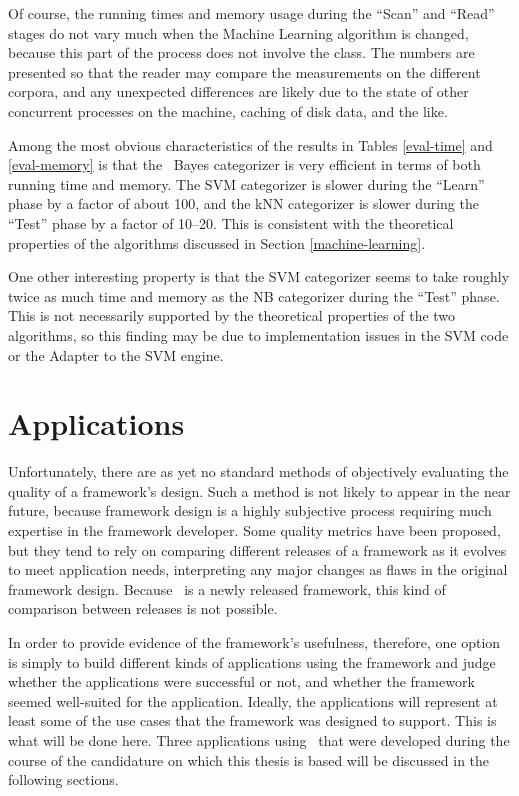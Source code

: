 Of course, the running times and memory usage during the ``Scan'' and
``Read'' stages do not vary much when the Machine Learning algorithm
is changed, because this part of the process does not involve the
 class.  The numbers are presented so that the reader
may compare the measurements on the different corpora, and any
unexpected differences are likely due to the state of other concurrent
processes on the machine, caching of disk data, and the like.

Among the most obvious characteristics of the results in Tables
\ref{eval-time} and \ref{eval-memory} is that the \naive\ Bayes
categorizer is very efficient in terms of both running time and
memory.  The SVM categorizer is slower during the ``Learn'' phase by a
factor of about 100, and the kNN categorizer is slower during the
``Test'' phase by a factor of 10--20.  This is consistent with the
theoretical properties of the algorithms discussed in Section
\ref{machine-learning}.

One other interesting property is that the SVM categorizer seems to
take roughly twice as much time and memory as the NB categorizer
during the ``Test'' phase.  This is not necessarily supported by the
theoretical properties of the two algorithms, so this finding may be
due to implementation issues in the SVM code or the Adapter to the SVM
engine.


\section{Applications}
\label{Applications}

Unfortunately, there are as yet no standard methods of objectively
evaluating the quality of a framework's design.  Such a method is not
likely to appear in the near future, because framework design is a
highly subjective process requiring much expertise in the framework
developer. \cite[sec. 1.5]{fayad:99} Some quality metrics have been
proposed, but they tend to rely on comparing different releases of a
framework as it evolves to meet application needs, interpreting any
major changes as flaws in the original framework
design. \cite[ch. 25]{fayad:99} Because \aicat\ is a newly released
framework, this kind of comparison between releases is not possible.

In order to provide evidence of the framework's usefulness, therefore,
one option is simply to build different kinds of applications using
the framework and judge whether the applications were successful or
not, and whether the framework seemed well-suited for the application.
Ideally, the applications will represent at least some of the use
cases that the framework was designed to support.  This is what will
be done here.  Three applications using \aicat\ that were developed
during the course of the candidature on which this thesis is based
will be discussed in the following sections.

